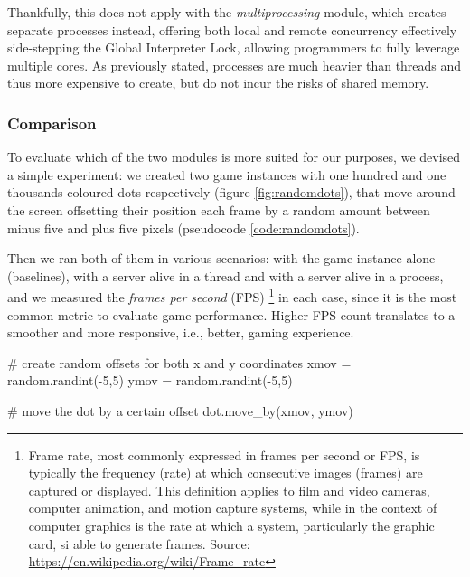 Thankfully, this does not apply with the \textit{multiprocessing} module, which creates separate processes instead, offering both local and remote concurrency effectively side-stepping the Global Interpreter Lock, allowing programmers to fully leverage multiple cores. As previously stated, processes are much heavier than threads and thus more expensive to create, but do not incur the risks of shared memory. 

\subsubsection{Comparison}

To evaluate which of the two modules is more suited for our purposes, we devised a simple experiment: we created two game instances with one hundred and one thousands coloured dots respectively (figure \ref{fig:randomdots}), that move around the screen offsetting their position each frame by a random amount between minus five and plus five pixels (pseudocode \ref{code:randomdots}).

Then we ran both of them in various scenarios: with the game instance alone (baselines), with a server alive in a thread and with a server alive in a process, and we measured the \textit{frames per second} (FPS) \footnote{Frame rate, most commonly expressed in frames per second or FPS, is typically the frequency (rate) at which consecutive images (frames) are captured or displayed. This definition applies to film and video cameras, computer animation, and motion capture systems, while in the context of computer graphics is the rate at which a system, particularly the graphic card, si able to generate frames. Source: \url{https://en.wikipedia.org/wiki/Frame_rate}} in each case, since it is the most common metric to evaluate game performance. Higher FPS-count translates to a smoother and more responsive, i.e., better, gaming experience.

\label{code:randomdots}
\begin{python} 
# create random offsets for both x and y coordinates
xmov = random.randint(-5,5)
ymov = random.randint(-5,5)

# move the dot by a certain offset
dot.move_by(xmov, ymov)
\end{python}

